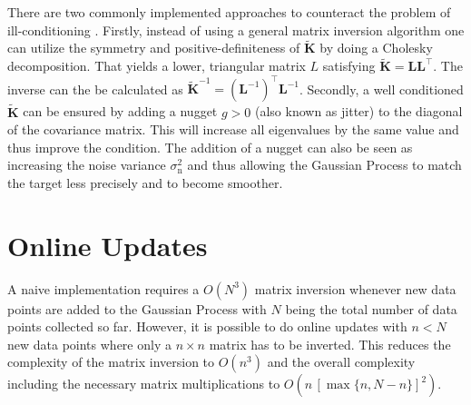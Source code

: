 \documentclass[11pt,a4paper,twoside,BCOR=15mm]{scrreprt}
\newcommand{\mat}[1]{\bm{#1}}
\newcommand{\Tr}{^{\top}}
\newcommand{\ped}[1]{_{\mathrm{#1}}}
\begin{document}
There are two commonly implemented approaches to counteract the problem of 
ill-conditioning \parencite[cp.]{Sacks:1989cv, Neal:1997tj, Booker:1999wz, 
    Gramacy:2008es}. Firstly, instead of using a general matrix inversion 
algorithm one can utilize the symmetry and positive-definiteness of 
$\tilde{\mat{K}}$ by doing a Cholesky decomposition. That yields a lower, 
triangular matrix $L$ satisfying $\tilde{\mat K} = \mat L\mat L\Tr$. The inverse 
can the be calculated as $\tilde{\mat K}^{-1} = (\mat L^{-1})\Tr \mat L^{-1}$.  
Secondly, a well conditioned $\tilde{\mat K}$ can be ensured by adding a nugget 
$g > 0$ (also known as jitter) to the diagonal of the covariance matrix. This 
will increase all eigenvalues by the same value and thus improve the condition.  
The addition of a nugget can also be seen as increasing the noise variance 
$\sigma\ped{n}^2$ and thus allowing the Gaussian Process to match the target 
less precisely and to become smoother.

\section{Online Updates}
A naive implementation requires a $O(N^3)$ matrix inversion whenever new data 
points are added to the Gaussian Process with $N$ being the total number of data 
points collected so far. However, it is possible to do online updates with $n 
< N$ new data points where only a $n \times n$ matrix has to be inverted. This 
reduces the complexity of the matrix inversion to $O(n^3)$ and the overall 
complexity including the necessary matrix multiplications to $O(n\,{[\max\{n, 
    N - n\}]}^2)$.
\end{document}
